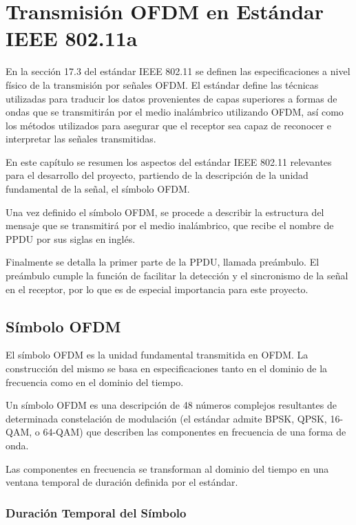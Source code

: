 \chapter{Transmisión OFDM en Estándar IEEE 802.11a}
\label{Ch:2}
\graphicspath{{figs/}}

En la sección 17.3 del estándar IEEE 802.11\cite{ieee} se definen las especificaciones a nivel físico de la transmisión por señales OFDM. El estándar define las técnicas utilizadas para traducir los datos provenientes de capas superiores a formas de ondas que se transmitirán por el medio inalámbrico utilizando OFDM, así como los métodos utilizados para asegurar que el receptor sea capaz de reconocer e interpretar las señales transmitidas.

En este capítulo se resumen los aspectos del estándar IEEE 802.11 relevantes para el desarrollo del proyecto, partiendo de la descripción de la unidad fundamental de la señal, el símbolo OFDM.

Una vez definido el símbolo OFDM, se procede a describir la estructura del mensaje que se transmitirá por el medio inalámbrico, que recibe el nombre de PPDU por sus siglas en inglés.

Finalmente se detalla la primer parte de la PPDU, llamada preámbulo. El preámbulo cumple la función de facilitar la detección y el sincronismo de la señal en el receptor, por lo que es de especial importancia para este proyecto.

\section{Símbolo OFDM}
\label{S:ch2-simbolo}

El símbolo OFDM es la unidad fundamental transmitida en OFDM. La construcción del mismo se basa en especificaciones tanto en el dominio de la frecuencia como en el dominio del tiempo.

Un símbolo OFDM es una descripción de 48 números complejos resultantes de determinada constelación de modulación (el estándar admite BPSK, QPSK, 16-QAM, o 64-QAM) que describen las componentes en frecuencia de una forma de onda. 

Las componentes en frecuencia se transforman al dominio del tiempo en una ventana temporal de duración definida por el estándar. 

\subsection{Duración Temporal del Símbolo}
\label{Ss:ch2-tiempo-simbolo}

